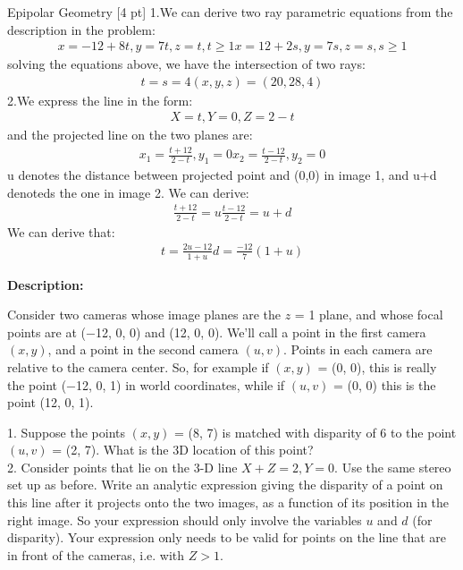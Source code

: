 \documentclass{assignment}
\begin{document}
\begin{problemlist}
\newpage
\pbitem Epipolar Geometry [4 pt]
1.We can derive two ray parametric equations from the description in the problem:
\begin{align*}
    x = -12 + 8t, y = 7t, z = t, t\geq1
    x = 12 + 2s, y = 7s, z = s, s\geq1
\end{align*}
solving the equations above, we have the intersection of two rays:
\begin{align*}
    t = s = 4
    (x,y,z) = (20,28,4)
\end{align*}
2.We express the line in the form:
\begin{align*}
    X = t , Y = 0 , Z = 2-t
\end{align*}
and the projected line on the two planes are:
\begin{align*}
    x_1 = \frac{t+12}{2-t}, y_1 = 0
    x_2 = \frac{t-12}{2-t}, y_2 = 0
\end{align*}
u denotes the distance between projected point and (0,0) in image 1, and u+d denoteds the one in image 2. We can derive:
\begin{align*}
    \frac{t+12}{2-t} = u
    \frac{t-12}{2-t} = u+d
\end{align*}
We can derive that:
\begin{align*}
    t = \frac{2u-12}{1+u}
    d = \frac{-12}{7}(1+u)
\end{align*}

\textbf{Description:}

Consider two cameras whose image planes are the $z$ = 1 plane, and whose focal points are at (−12, 0, 0) and (12, 0, 0). We’ll call a point in the first camera $(x, y)$, and a point in the second camera $(u, v)$. Points in each camera are relative to the camera center. So, for example if $(x, y)$ = (0, 0), this is really the point (−12, 0, 1) in world coordinates, while if $(u, v)$ = (0, 0) this is the point (12, 0, 1).


1. Suppose the points $(x, y)$ = (8, 7) is matched with disparity of 6 to the point $(u, v)$ = (2, 7). What is the 3D location of this point?\\

2. Consider points that lie on the 3-D line $X + Z = 2,Y = 0$. Use the same stereo set up as before. Write an analytic expression giving the disparity of a point on this line after it projects onto the two images, as a function of its position in the right image. So your expression should only involve the variables $u$ and $d$ (for disparity). Your expression only needs to be valid for points on the line that are in front of the cameras, i.e. with $Z > 1$.\\


\end{problemlist}
\end{document}
